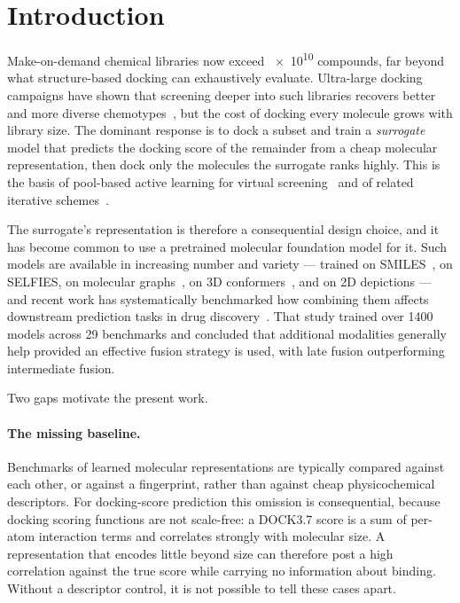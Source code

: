 \section{Introduction}
\label{sec:intro}

Make-on-demand chemical libraries now exceed \num{e10} compounds, far beyond
what structure-based docking can exhaustively evaluate. Ultra-large docking
campaigns have shown that screening deeper into such libraries recovers
better and more diverse chemotypes~\citep{lyu2019ultralarge}, but the cost of
docking every molecule grows with library size. The dominant response is to
dock a subset and train a \emph{surrogate} model that predicts the docking
score of the remainder from a cheap molecular representation, then dock only
the molecules the surrogate ranks highly. This is the basis of pool-based
active learning for virtual screening~\citep{graff2021molpal} and of related
iterative schemes~\citep{gentile2022deepdocking}.

The surrogate's representation is therefore a consequential design choice, and
it has become common to use a pretrained molecular foundation model for it.
Such models are available in increasing number and variety --- trained on
SMILES~\citep{ross2022molformer,soares2025smited}, on
SELFIES, on molecular graphs~\citep{rong2020grover}, on 3D
conformers~\citep{zhou2023unimol}, and on 2D depictions --- and recent work has
systematically benchmarked how combining them affects downstream prediction
tasks in drug discovery~\citep{martinezgalindo2026multimodality}. That study
trained over \num{1400} models across \num{29} benchmarks and concluded that
additional modalities generally help provided an effective fusion strategy is
used, with late fusion outperforming intermediate fusion.

Two gaps motivate the present work.

\paragraph{The missing baseline.}
Benchmarks of learned molecular representations are typically compared against
each other, or against a fingerprint, rather than against cheap
physicochemical descriptors. For docking-score prediction this omission is
consequential, because docking scoring functions are not scale-free: a
DOCK3.7 score is a sum of per-atom interaction terms and correlates strongly
with molecular size. A representation that encodes little beyond size can
therefore post a high correlation against the true score while carrying no
information about binding. Without a descriptor control, it is not possible to
tell these cases apart.

